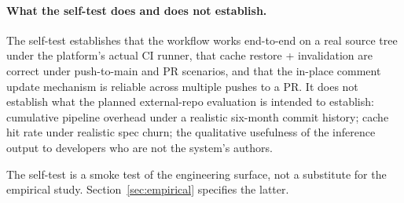 \paragraph{What the self-test does and does not establish.}
The self-test establishes that the workflow works end-to-end on a real source tree under the platform's actual CI runner, that cache restore + invalidation are correct under push-to-main and PR scenarios, and that the in-place comment update mechanism is reliable across multiple pushes to a PR. It does not establish what the planned external-repo evaluation is intended to establish: cumulative pipeline overhead under a realistic six-month commit history; cache hit rate under realistic spec churn; the qualitative usefulness of the inference output to developers who are not the system's authors.

The self-test is a smoke test of the engineering surface, not a substitute for the empirical study. Section~\ref{sec:empirical} specifies the latter.
